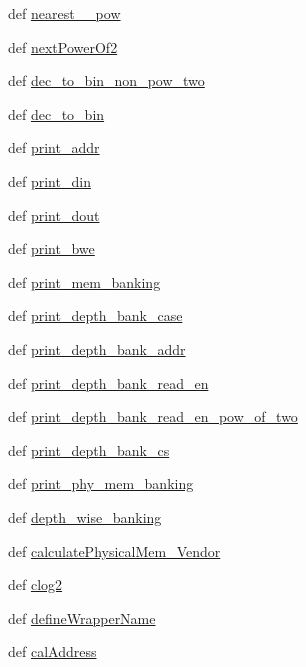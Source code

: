 \begin{DoxyCompactItemize}
\item 
def \hyperlink{classsrc_1_1memgen_1_1memgen_ae8ef06bfdc2ef00f80e90d3e10f22044}{nearest\-\_\-\_\-pow}
\item 
def \hyperlink{classsrc_1_1memgen_1_1memgen_ab48b4c7d0d0487fef1ffe02cab6ef992}{next\-Power\-Of2}
\item 
def \hyperlink{classsrc_1_1memgen_1_1memgen_a3abc8de39d5a2750d21ec2a671659668}{dec\-\_\-to\-\_\-bin\-\_\-non\-\_\-pow\-\_\-two}
\item 
def \hyperlink{classsrc_1_1memgen_1_1memgen_a14c92664e7866134e7b35c8b830db31b}{dec\-\_\-to\-\_\-bin}
\item 
def \hyperlink{classsrc_1_1memgen_1_1memgen_a98a4ea268cbe53f59170f287e379df36}{print\-\_\-addr}
\item 
def \hyperlink{classsrc_1_1memgen_1_1memgen_a8bcce980b2baf6f40fe2381b34f039d7}{print\-\_\-din}
\item 
def \hyperlink{classsrc_1_1memgen_1_1memgen_ad6500b5cdbd02e2745e0dad992820598}{print\-\_\-dout}
\item 
def \hyperlink{classsrc_1_1memgen_1_1memgen_aba70ea09aaabea6636aa293d8731edb1}{print\-\_\-bwe}
\item 
def \hyperlink{classsrc_1_1memgen_1_1memgen_ad8caee8ce927069b88cc26adc0febe20}{print\-\_\-mem\-\_\-banking}
\item 
def \hyperlink{classsrc_1_1memgen_1_1memgen_ac7ee56340a023be9ae829d1e4fe917c9}{print\-\_\-depth\-\_\-bank\-\_\-case}
\item 
def \hyperlink{classsrc_1_1memgen_1_1memgen_acf1ef06d533606d3d8368a9ef23ebe08}{print\-\_\-depth\-\_\-bank\-\_\-addr}
\item 
def \hyperlink{classsrc_1_1memgen_1_1memgen_a33834e054837c6f2cf8e9eeb6c903dcb}{print\-\_\-depth\-\_\-bank\-\_\-read\-\_\-en}
\item 
def \hyperlink{classsrc_1_1memgen_1_1memgen_a738be59c66fc3976b061930b6931785a}{print\-\_\-depth\-\_\-bank\-\_\-read\-\_\-en\-\_\-pow\-\_\-of\-\_\-two}
\item 
def \hyperlink{classsrc_1_1memgen_1_1memgen_a1d9cab314fa8e36abab8324e96c4ace4}{print\-\_\-depth\-\_\-bank\-\_\-cs}
\item 
def \hyperlink{classsrc_1_1memgen_1_1memgen_a2e4ee24c3137e71421df4a8b7d51af1e}{print\-\_\-phy\-\_\-mem\-\_\-banking}
\item 
def \hyperlink{classsrc_1_1memgen_1_1memgen_ab1f8515e2a080b96150edc513847c218}{depth\-\_\-wise\-\_\-banking}
\item 
def \hyperlink{classsrc_1_1memgen_1_1memgen_ad5ad0e7fc45c4104106e0783bec573b8}{calculate\-Physical\-Mem\-\_\-\-Vendor}
\item 
def \hyperlink{classsrc_1_1memgen_1_1memgen_a5c68d51994ac1234a8c5fa363d0985db}{clog2}
\item 
def \hyperlink{classsrc_1_1memgen_1_1memgen_a898a00fab84a18619c5d38e084711a47}{define\-Wrapper\-Name}
\item 
def \hyperlink{classsrc_1_1memgen_1_1memgen_a6f7e14a1fe185e74d38ca270caf88ee8}{cal\-Address}
\end{DoxyCompactItemize}
